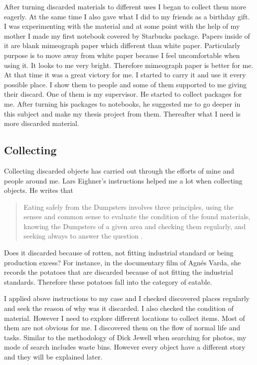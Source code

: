 After turning discarded materials to different uses I began to collect them more eagerly. At the same time I also gave what I did to my friends as a birthday gift. I was experimenting with the material and at some point with the help of my mother I made my first notebook covered by Starbucks package. Papers inside of it are blank mimeograph paper which different than white paper. Particularly purpose is to move away from white paper because I feel uncomfortable when using it. It looks to me very bright. Therefore mimeograph paper is better for me. At that time it was a great victory for me. I started to carry it and use it every possible place. I show them to people and some of them supported to me giving their discard. One of them is my supervisor. He started to collect packages for me. After turning his packages to notebooks, he suggested me to go deeper in this subject and make my thesis project from them. Thereafter what I need is more discarded material.


\subsection{Collecting}
Collecting discarded objects has carried out through the efforts of mine and people around me. Lars Eighner's instructions helped me a lot when collecting objects. He writes that 

\begin{quote}
Eating safely from the Dumpsters involves three principles, using the senses and common sense to evaluate the condition of the found materials, knowing the Dumpsters of a given area and checking them regularly, and seeking always to answer the question  \citep[as cited in][6]{strasser1999waste}.
\end{quote}

Does it discarded because of rotten, not fitting industrial standard or being production excess? For instance, in the documentary film of Agnés Varda, she records the potatoes that are discarded because of not fitting the industrial standards. Therefore these potatoes fall into the category of eatable.

I applied above instructions to my case and I checked discovered places regularly and seek the reason of why was it discarded. I also checked the condition of material. However I need to explore different locations to collect items. Most of them are not obvious for me. I discovered them on the flow of normal life and tasks. Similar to the methodology of Dick Jewell when searching for photos, my mode of search includes waste bins. However every object have a different story and they will be explained later.

